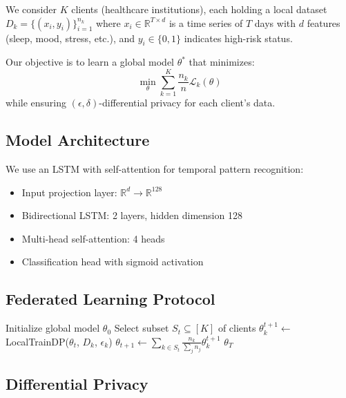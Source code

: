 \documentclass[11pt,a4paper]{article}
\begin{document}
We consider $K$ clients (healthcare institutions), each holding a local dataset $D_k = \{(x_i, y_i)\}_{i=1}^{n_k}$ where $x_i \in \mathbb{R}^{T \times d}$ is a time series of $T$ days with $d$ features (sleep, mood, stress, etc.), and $y_i \in \{0, 1\}$ indicates high-risk status.

Our objective is to learn a global model $\theta^*$ that minimizes:
\begin{equation}
    \min_\theta \sum_{k=1}^{K} \frac{n_k}{n} \mathcal{L}_k(\theta)
\end{equation}
while ensuring $(\epsilon, \delta)$-differential privacy for each client's data.

\subsection{Model Architecture}

We use an LSTM with self-attention for temporal pattern recognition:
\begin{itemize}
    \item Input projection layer: $\mathbb{R}^d \rightarrow \mathbb{R}^{128}$
    \item Bidirectional LSTM: 2 layers, hidden dimension 128
    \item Multi-head self-attention: 4 heads
    \item Classification head with sigmoid activation
\end{itemize}

\subsection{Federated Learning Protocol}

\begin{algorithm}
\caption{FedAvg with Differential Privacy}
\begin{algorithmic}[1]
\STATE Initialize global model $\theta_0$
    \STATE Select subset $S_t \subseteq [K]$ of clients
        \STATE $\theta_k^{t+1} \leftarrow$ LocalTrainDP($\theta_t$, $D_k$, $\epsilon_k$)
    \ENDFOR
    \STATE $\theta_{t+1} \leftarrow \sum_{k \in S_t} \frac{n_k}{\sum_j n_j} \theta_k^{t+1}$
\ENDFOR
\RETURN $\theta_T$
\end{algorithmic}
\end{algorithm}

\subsection{Differential Privacy}
\end{document}
